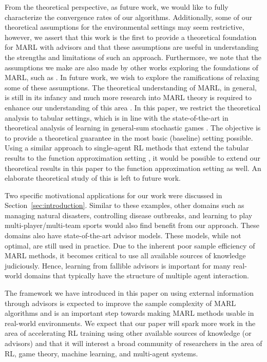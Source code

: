\documentclass[jair, twoside,11pt,theapa]{article}
\begin{document}
From the theoretical perspective, as future work, we would like to fully characterize the convergence rates of our algorithms. Additionally, some of our theoretical assumptions for the environmental settings may seem restrictive, however, we assert that this work is the first to provide a theoretical foundation for MARL with advisors and that these assumptions are useful in understanding the strengths and limitations of such an approach. Furthermore, we note that the assumptions we make are also made by other works exploring the foundations of MARL, such as \citet{hu2003nash}. In future work, we wish to explore the ramifications of relaxing some of these assumptions. The theoretical understanding of MARL, in general, is still in its infancy and much more research into MARL theory is required to enhance our understanding of this area \citep{zhang2019multi}. In this paper, we restrict the theoretical analysis to tabular settings, which is in line with the state-of-the-art in theoretical analysis of learning in general-sum stochastic games \citep{zhang2019multi}. The objective is to provide a theoretical guarantee in the most basic (baseline) setting possible. Using a similar approach to single-agent RL methods that extend the tabular results to the function approximation setting \citep{carvalho2020new}, it would be possible to extend our theoretical results in this paper to the function approximation setting as well. An elaborate theoretical study of this is left to future work. 


Two specific motivational applications for our work were discussed in Section~\ref{sec:introduction}. Similar to these examples, other domains such as managing natural disasters, controlling disease outbreaks, and learning to play multi-player/multi-team sports would also find benefit from our approach. These domains also have state-of-the-art advisor models. These models, while not optimal, are still used in practice. Due to the inherent poor sample efficiency of MARL methods, it becomes critical to use all available sources of knowledge judiciously. Hence, learning from fallible advisors is important for many real-world domains that typically have the structure of multiple agent interaction.

The framework we have introduced in this paper on using external information through advisors is expected to improve the sample complexity of MARL algorithms and is an important step towards making MARL methods usable in real-world environments. We expect that our paper will spark more work in the  area of accelerating RL training using other available sources of knowledge (or advisors) and that it will interest a broad community of researchers in the area of RL, game theory, machine learning, and multi-agent systems. 
\end{document}
